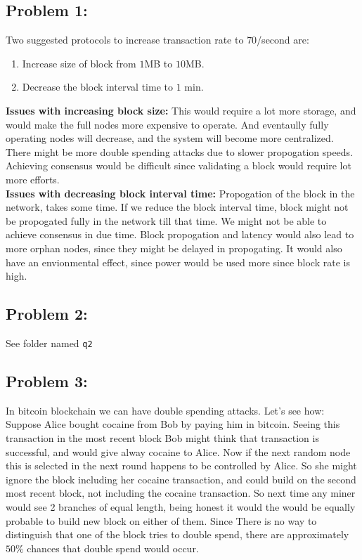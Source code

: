 \documentclass[a4paper]{article}
\begin{document}
\subsection*{Problem 1:}
Two suggested protocols to increase transaction rate to $70$/second are:
\begin{enumerate}
    \item Increase size of block from $1$MB to $10$MB.
    \item Decrease the block interval time to $1$ min.
\end{enumerate}
\textbf{Issues with increasing block size:} This would require a lot more storage, and would make the full
            nodes more expensive to operate. And eventaully fully operating nodes will decrease, and the system
            will become more centralized. There might be more double spending attacks due to slower propogation
            speeds. Achieving consensus would be difficult since validating a block would require lot more efforts. \\

\textbf{Issues with decreasing block interval time:} Propogation of the block in the network, takes some time. 
            If we reduce the block interval time, block might not be propogated fully in the network till that time.
            We might not be able to achieve consensus in due time. Block propogation and latency would also lead to more
            orphan nodes, since they might be delayed in propogating. It would also have an envionmental effect, since
            power would be used more since block rate is high.

\subsection*{Problem 2:}
See folder named \texttt{q2}

\subsection*{Problem 3:}
In bitcoin blockchain we can have double spending attacks. Let's see how: \\

Suppose Alice bought cocaine from Bob by paying him in bitcoin. Seeing this transaction in the most
recent block Bob might think that transaction is successful, and would give alway cocaine to Alice.
Now if the next random node this is selected in the next round happens to be controlled by Alice.
So she might ignore the block including her cocaine transaction, and could build on the second most recent block,
not including the cocaine transaction. So next time any miner would see 2 branches of equal length,
being honest it would the would be equally probable to build new block on either of them. Since There
is no way to distinguish that one of the block tries to double spend, there are approximately $50\%$ chances
that double spend would occur.\\
\end{document}
